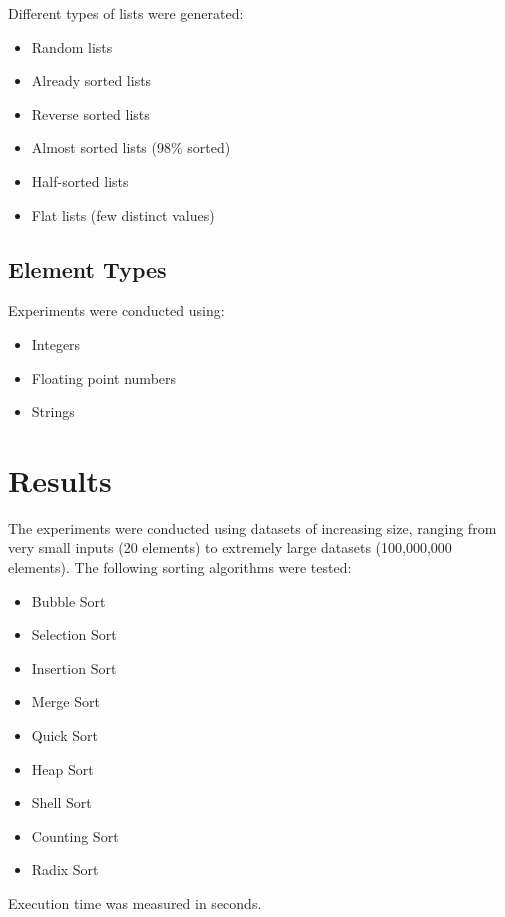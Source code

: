 \documentclass[12pt]{article}
\begin{document}
Different types of lists were generated:

\begin{itemize}
\item Random lists
\item Already sorted lists
\item Reverse sorted lists
\item Almost sorted lists (98\% sorted)
\item Half-sorted lists
\item Flat lists (few distinct values)
\end{itemize}

\subsection{Element Types}

Experiments were conducted using:

\begin{itemize}
\item Integers
\item Floating point numbers
\item Strings
\end{itemize}

\section{Results}

The experiments were conducted using datasets of increasing size, ranging from very small inputs (20 elements) to extremely large datasets (100,000,000 elements). The following sorting algorithms were tested:

\begin{itemize}
\item Bubble Sort
\item Selection Sort
\item Insertion Sort
\item Merge Sort
\item Quick Sort
\item Heap Sort
\item Shell Sort
\item Counting Sort
\item Radix Sort
\end{itemize}

Execution time was measured in seconds.
\end{document}
